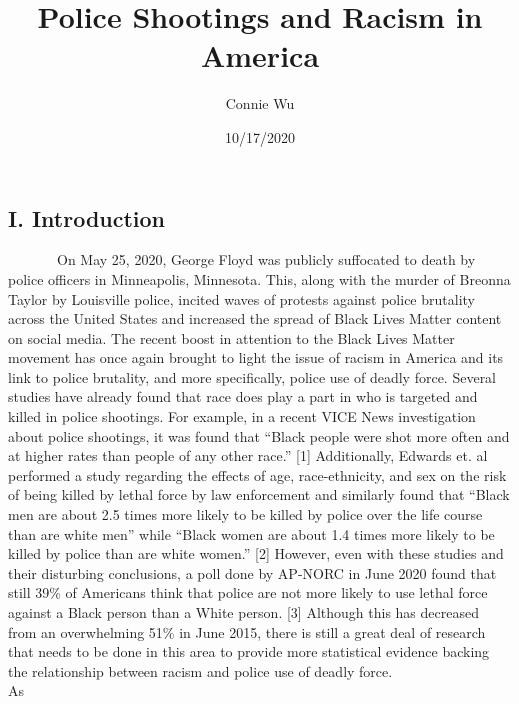 \documentclass[
]{article}
\title{Police Shootings and Racism in America}
\author{Connie Wu}
\date{10/17/2020}
\begin{document}
\maketitle

\hypertarget{i.-introduction}{%
\subsection{I. Introduction}\label{i.-introduction}}

~~~~~~~On May 25, 2020, George Floyd was publicly suffocated to death by
police officers in Minneapolis, Minnesota. This, along with the murder
of Breonna Taylor by Louisville police, incited waves of protests
against police brutality across the United States and increased the
spread of Black Lives Matter content on social media. The recent boost
in attention to the Black Lives Matter movement has once again brought
to light the issue of racism in America and its link to police
brutality, and more specifically, police use of deadly force. Several
studies have already found that race does play a part in who is targeted
and killed in police shootings. For example, in a recent VICE News
investigation about police shootings, it was found that ``Black people
were shot more often and at higher rates than people of any other
race.'' {[}1{]} Additionally, Edwards et. al performed a study regarding
the effects of age, race-ethnicity, and sex on the risk of being killed
by lethal force by law enforcement and similarly found that ``Black men
are about 2.5 times more likely to be killed by police over the life
course than are white men'' while ``Black women are about 1.4 times more
likely to be killed by police than are white women.'' {[}2{]} However,
even with these studies and their disturbing conclusions, a poll done by
AP-NORC in June 2020 found that still 39\% of Americans think that
police are not more likely to use lethal force against a Black person
than a White person. {[}3{]} Although this has decreased from an
overwhelming 51\% in June 2015, there is still a great deal of research
that needs to be done in this area to provide more statistical evidence
backing the relationship between racism and police use of deadly
force.\\
\hspace*{0.333em}\hspace*{0.333em}\hspace*{0.333em}\hspace*{0.333em}\hspace*{0.333em}\hspace*{0.333em}\hspace*{0.333em}As
\end{document}
